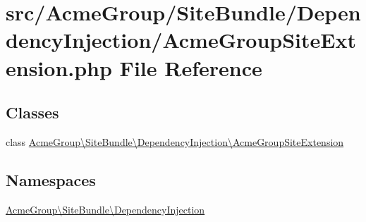 \hypertarget{_acme_group_site_extension_8php}{\section{src/\+Acme\+Group/\+Site\+Bundle/\+Dependency\+Injection/\+Acme\+Group\+Site\+Extension.php File Reference}
\label{_acme_group_site_extension_8php}
}
\subsection*{Classes}
\begin{DoxyCompactItemize}
\item 
class \hyperlink{class_acme_group_1_1_site_bundle_1_1_dependency_injection_1_1_acme_group_site_extension}{Acme\+Group\textbackslash{}\+Site\+Bundle\textbackslash{}\+Dependency\+Injection\textbackslash{}\+Acme\+Group\+Site\+Extension}
\end{DoxyCompactItemize}
\subsection*{Namespaces}
\begin{DoxyCompactItemize}
\item 
 \hyperlink{namespace_acme_group_1_1_site_bundle_1_1_dependency_injection}{Acme\+Group\textbackslash{}\+Site\+Bundle\textbackslash{}\+Dependency\+Injection}
\end{DoxyCompactItemize}
